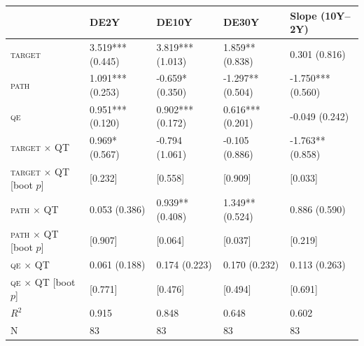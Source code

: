 \begin{tabular}{lllll}
\toprule
 & DE2Y & DE10Y & DE30Y & Slope (10Y--2Y) \\
\midrule
\textsc{target} & 3.519*** (0.445) & 3.819*** (1.013) & 1.859** (0.838) & 0.301 (0.816) \\
\textsc{path} & 1.091*** (0.253) & -0.659* (0.350) & -1.297** (0.504) & -1.750*** (0.560) \\
\textsc{qe} & 0.951*** (0.120) & 0.902*** (0.172) & 0.616*** (0.201) & -0.049 (0.242) \\
\textsc{target} $\times$ QT & 0.969* (0.567) & -0.794 (1.061) & -0.105 (0.886) & -1.763** (0.858) \\
\textsc{target} $\times$ QT [boot $p$] & [0.232] & [0.558] & [0.909] & [0.033] \\
\textsc{path} $\times$ QT & 0.053 (0.386) & 0.939** (0.408) & 1.349** (0.524) & 0.886 (0.590) \\
\textsc{path} $\times$ QT [boot $p$] & [0.907] & [0.064] & [0.037] & [0.219] \\
\textsc{qe} $\times$ QT & 0.061 (0.188) & 0.174 (0.223) & 0.170 (0.232) & 0.113 (0.263) \\
\textsc{qe} $\times$ QT [boot $p$] & [0.771] & [0.476] & [0.494] & [0.691] \\
$R^2$ & 0.915 & 0.848 & 0.648 & 0.602 \\
N & 83 & 83 & 83 & 83 \\
\bottomrule
\end{tabular}
